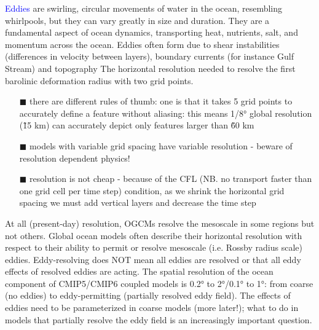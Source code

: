\textcolor{Blue}{Eddies} are swirling, circular movements of water in the ocean, resembling whirlpools, but they can vary greatly in size and duration. They are a fundamental aspect of ocean dynamics, transporting heat, nutrients, salt, and momentum across the ocean. Eddies often form due to shear instabilities (differences in velocity between layers), boundary currents (for instance Gulf Stream) and topography
The horizontal resolution needed to resolve the first barolinic deformation radius with two grid points.
\begin{itemize}
	\item[$\blacksquare$] there are different rules of thumb: one is that it takes 5 grid points to accurately define a feature without aliasing: this means 1/8° global resolution (\~15 km) can accurately depict only features larger than \~60 km
	\item[$\blacksquare$] models with variable grid spacing have variable resolution - beware of resolution dependent physics!
	\item[$\blacksquare$] resolution is not cheap - because of the CFL (NB. no transport faster than one grid cell per time step) condition, as we shrink the horizontal grid spacing we must add vertical layers and decrease the time step
\end{itemize}
At all (present-day) resolution, OGCMs resolve the mesoscale in some regions but not others.
Global ocean models often describe their horizontal
resolution with respect to their ability to permit or
resolve mesoscale (i.e. Rossby radius scale) eddies. Eddy-resolving does NOT mean all eddies are resolved or that all eddy effects of resolved eddies are acting. The spatial resolution of the ocean component of CMIP5/CMIP6 coupled models is 0.2° to 2°/0.1° to 1°: from coarse (no eddies) to eddy-permitting (partially resolved eddy field). The effects of eddies need to be parameterized in coarse models (more later!); what to do in models that partially resolve the eddy field is an increasingly important question.

